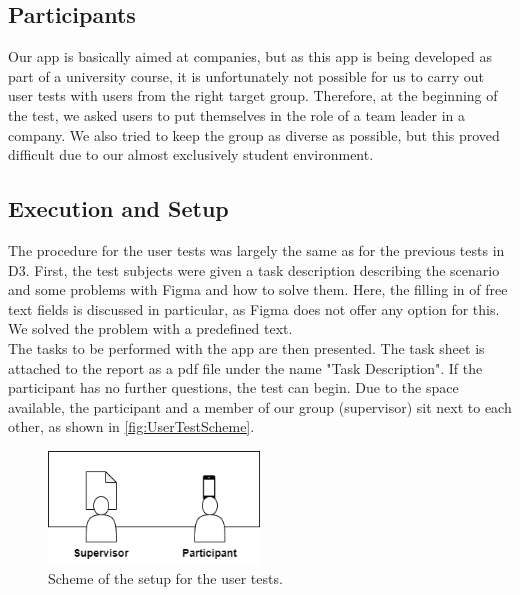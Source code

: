 \documentclass[11pt]{article}
\begin{document}
\subsection{Participants}
Our app is basically aimed at companies, but as this app is being developed as part of a university course, it is unfortunately not possible for us to carry out user tests with users from the right target group. Therefore, at the beginning of the test, we asked users to put themselves in the role of a team leader in a company. We also tried to keep the group as diverse as possible, but this proved difficult due to our almost exclusively student environment. 

\subsection{Execution and Setup}
The procedure for the user tests was largely the same as for the previous tests in D3. First, the test subjects were given a task description describing the scenario and some problems with Figma and how to solve them. Here, the filling in of free text fields is discussed in particular, as Figma does not offer any option for this. We solved the problem with a predefined text.\\
The tasks to be performed with the app are then presented. The task sheet is attached to the report as a pdf file under the name "Task Description". If the participant has no further questions, the test can begin. Due to the space available, the participant and a member of our group (supervisor) sit next to each other, as shown in \autoref{fig:UserTestScheme}.\\
\begin{figure}[h!]
    \centering
    \includegraphics[width=0.5\textwidth]{figures/UserTest_Scheme.png}
    \caption{Scheme of the setup for the user tests.}
    \label{fig:UserTestScheme}
\end{figure}
\end{document}
